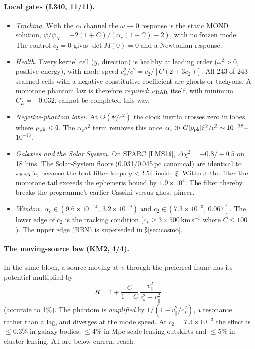 \documentclass[10pt]{article}
\begin{document}
\paragraph{Local gates (L340, 11/11).}
\begin{itemize}
\item \emph{Tracking.} With the $c_2$ channel the $\omega\to0$ response is the static MOND solution, $\psi/\psi_N=-2(1+C)/(\alpha_c(1+C)-2)$, with no frozen mode. The control $c_2=0$ gives $\det M(0)=0$ and a Newtonian response.
\item \emph{Health.} Every kernel cell ($y$, direction) is healthy at leading order ($\omega^2>0$, positive energy), with mode speed $c_s^2/c^2=c_2/[C(2+3c_2)]$. All 243 of 243 scanned cells with a negative constitutive coefficient are ghosts or tachyons. A monotone phantom law is therefore \emph{required}: $\nu_{\rm RAR}$ itself, with minimum $C_L=-0.032$, cannot be completed this way.
\item \emph{Negative-phantom lobes.} At $O(\Phi/c^2)$ the clock inertia crosses zero in lobes where $\rho_{\rm ph}<0$. The $\alpha_ca^2$ term removes this once $\alpha_c\gg G|\rho_{\rm ph}|\xi^2/c^2\sim10^{-18}$--$10^{-13}$.
\item \emph{Galaxies and the Solar System.} On SPARC [LMS16], $\Delta\chi^2=-0.8/+0.5$ on 18 bins. The Solar-System floors (0.031/0.045\,pc canonical) are identical to $\nu_{\rm RAR}$'s, because the heat filter keeps $y<2.54$ inside $\xi$. Without the filter the monotone tail exceeds the ephemeris bound by $1.9\times10^4$. The filter thereby breaks the programme's earlier Cassini-versus-ghost pincer.
\item \emph{Window.} $\alpha_c\in(9.6\times10^{-14},\,3.2\times10^{-9})$ and $c_2\in(7.3\times10^{-3},\,0.067)$. The lower edge of $c_2$ is the tracking condition ($c_s\geq3\times600$\,km\,s$^{-1}$ where $C\leq100$). The upper edge (BBN) is superseded in \S\ref{sec:cosmo}.
\end{itemize}

\paragraph{The moving-source law (KM2, 4/4).}
In the same block, a source moving at $v$ through the preferred frame has its potential multiplied by
\begin{equation}
R=1+\frac{C}{1+C}\,\frac{v_\parallel^2}{c_s^2-v_\parallel^2}
\end{equation}
(accurate to 1\%). The phantom is \emph{amplified} by $1/(1-v_\parallel^2/c_s^2)$, a resonance rather than a lag, and diverges at the mode speed. At $c_2=7.3\times10^{-3}$ the effect is $\leq0.3\%$ in galaxy bodies, $\leq4\%$ in Mpc-scale lensing outskirts and $\leq5\%$ in cluster lensing. All are below current reach.
\end{document}
